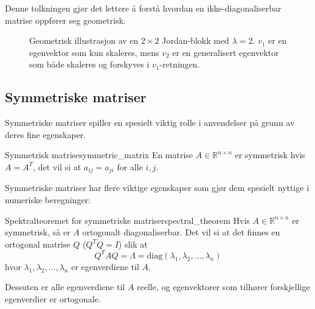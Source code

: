 Denne tolkningen gjør det lettere å forstå hvordan en ikke-diagonaliserbar matrise oppfører seg geometrisk.

\begin{figure}[H]
	\centering
	\caption{Geometrisk illustrasjon av en $2 \times 2$ Jordan-blokk med $\lambda = 2$. $v_1$ er en egenvektor som kun skaleres, mens $v_2$ er en generalisert egenvektor som både skaleres og forskyves i $v_1$-retningen.}
	\label{fig:jordan_action}
\end{figure}

\subsection{Symmetriske matriser}
Symmetriske matriser spiller en spesielt viktig rolle i anvendelser på grunn av deres fine egenskaper.

\begin{definition}{Symmetrisk matrise}{symmetric_matrix}
	En matrise $A \in \mathbb{R}^{n \times n}$ er symmetrisk hvis $A = A^T$, det vil si at $a_{ij} = a_{ji}$ for alle $i,j$.
\end{definition}

Symmetriske matriser har flere viktige egenskaper som gjør dem spesielt nyttige i numeriske beregninger:

\begin{theorem}{Spektralteoremet for symmetriske matriser}{spectral_theorem}
	Hvis $A \in \mathbb{R}^{n \times n}$ er symmetrisk, så er $A$ ortogonalt diagonaliserbar. Det vil si at det finnes en ortogonal matrise $Q$ ($Q^T Q = I$) slik at
	\[
		Q^T A Q = \Lambda = \text{diag}(\lambda_1, \lambda_2, \ldots, \lambda_n)
	\]
	hvor $\lambda_1, \lambda_2, \ldots, \lambda_n$ er egenverdiene til $A$.

	Dessuten er alle egenverdiene til $A$ reelle, og egenvektorer som tilhører forskjellige egenverdier er ortogonale.
\end{theorem}

